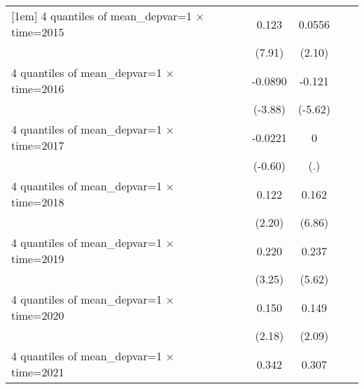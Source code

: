 \begin{table}[htbp]
\begin{tabular}{l*{6}{c}}
[1em]
4 quantiles of mean\_depvar=1 $\times$ time=2015&                     &                     &       0.123\sym{***}&      0.0556\sym{**} &                     &                     \\
                    &                     &                     &      (7.91)         &      (2.10)         &                     &                     \\
[1em]
4 quantiles of mean\_depvar=1 $\times$ time=2016&                     &                     &     -0.0890\sym{***}&      -0.121\sym{***}&                     &                     \\
                    &                     &                     &     (-3.88)         &     (-5.62)         &                     &                     \\
[1em]
4 quantiles of mean\_depvar=1 $\times$ time=2017&                     &                     &     -0.0221         &           0         &                     &                     \\
                    &                     &                     &     (-0.60)         &         (.)         &                     &                     \\
[1em]
4 quantiles of mean\_depvar=1 $\times$ time=2018&                     &                     &       0.122\sym{**} &       0.162\sym{***}&                     &                     \\
                    &                     &                     &      (2.20)         &      (6.86)         &                     &                     \\
[1em]
4 quantiles of mean\_depvar=1 $\times$ time=2019&                     &                     &       0.220\sym{***}&       0.237\sym{***}&                     &                     \\
                    &                     &                     &      (3.25)         &      (5.62)         &                     &                     \\
[1em]
4 quantiles of mean\_depvar=1 $\times$ time=2020&                     &                     &       0.150\sym{**} &       0.149\sym{**} &                     &                     \\
                    &                     &                     &      (2.18)         &      (2.09)         &                     &                     \\
[1em]
4 quantiles of mean\_depvar=1 $\times$ time=2021&                     &                     &       0.342\sym{***}&       0.307\sym{***}&                     &                     \\

\end{tabular}
\end{table}
